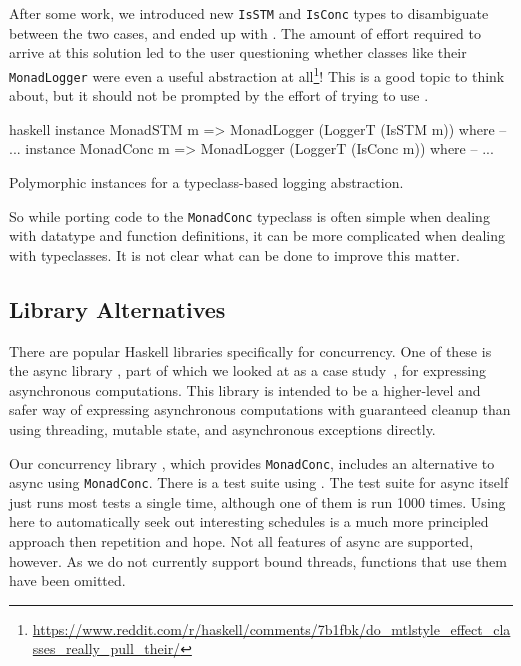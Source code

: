 After some work, we introduced new \verb|IsSTM| and \verb|IsConc|
types to disambiguate between the two cases, and ended up with
.  The amount of effort required to arrive at this
solution led to the user questioning whether classes like their
\verb|MonadLogger| were even a useful abstraction at
all\footnote{\url{https://www.reddit.com/r/haskell/comments/7b1fbk/do_mtlstyle_effect_classes_really_pull_their/}}!
This is a good topic to think about, but it should not be prompted by
the effort of trying to use \dejafu{}.

\begin{listing}
\centering
\begin{cminted}{haskell}
instance MonadSTM  m => MonadLogger (LoggerT (IsSTM  m)) where -- ...
instance MonadConc m => MonadLogger (LoggerT (IsConc m)) where -- ...
\end{cminted}
\caption{Polymorphic instances for a typeclass-based logging abstraction.}\label{lst:mlogger3}
\end{listing}

So while porting code to the \verb|MonadConc| typeclass is often
simple when dealing with datatype and function definitions, it can be
more complicated when dealing with typeclasses.  It is not clear what
can be done to improve this matter.

\subsection{Library Alternatives}

There are popular Haskell libraries specifically for concurrency.  One
of these is the async library \parencite{async}, part of which we looked at
as a case study~, for expressing
asynchronous computations.  This library is intended to be a
higher-level and safer way of expressing asynchronous computations
with guaranteed cleanup than using threading, mutable state, and
asynchronous exceptions directly.

Our concurrency library \parencite{concurrency}, which provides
\verb|MonadConc|, includes an alternative to async using
\verb|MonadConc|.  There is a test suite using \dejafu{}.  The test
suite for async itself just runs most tests a single time, although
one of them is run 1000 times.  Using \dejafu{} here to automatically
seek out interesting schedules is a much more principled approach then
repetition and hope.  Not all features of async are supported,
however.  As we do not currently support bound threads, functions that
use them have been omitted.

